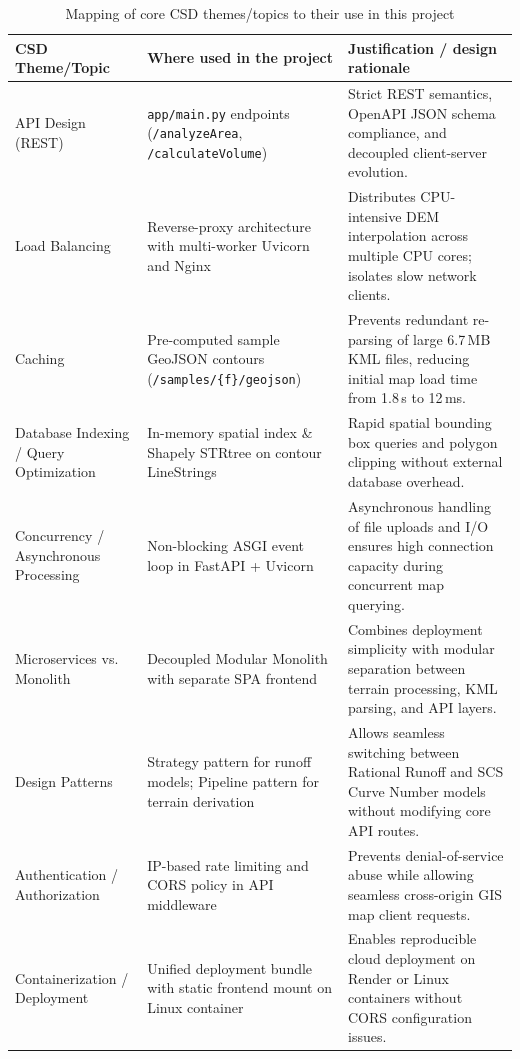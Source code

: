 \documentclass[manuscript,screen,review]{acmart}
\begin{document}
\begin{table}[t]
  \caption{Mapping of core CSD themes/topics to their use in this project}
  \label{tab:csd-themes}
  \small
  \begin{tabular}{p{2.8cm}p{5.2cm}p{6.5cm}}
    \toprule
    CSD Theme/Topic & Where used in the project & Justification / design rationale \\
    \midrule
    API Design (REST) & \texttt{app/main.py} endpoints (\texttt{/analyzeArea}, \texttt{/calculateVolume}) & Strict REST semantics, OpenAPI JSON schema compliance, and decoupled client-server evolution. \\
    Load Balancing & Reverse-proxy architecture with multi-worker Uvicorn and Nginx & Distributes CPU-intensive DEM interpolation across multiple CPU cores; isolates slow network clients. \\
    Caching & Pre-computed sample GeoJSON contours (\texttt{/samples/\{f\}/geojson}) & Prevents redundant re-parsing of large 6.7\,MB KML files, reducing initial map load time from 1.8\,s to 12\,ms. \\
    Database Indexing / Query Optimization & In-memory spatial index \& Shapely STRtree on contour LineStrings & Rapid spatial bounding box queries and polygon clipping without external database overhead. \\
    Concurrency / Asynchronous Processing & Non-blocking ASGI event loop in FastAPI + Uvicorn & Asynchronous handling of file uploads and I/O ensures high connection capacity during concurrent map querying. \\
    Microservices vs. Monolith & Decoupled Modular Monolith with separate SPA frontend & Combines deployment simplicity with modular separation between terrain processing, KML parsing, and API layers. \\
    Design Patterns & Strategy pattern for runoff models; Pipeline pattern for terrain derivation & Allows seamless switching between Rational Runoff and SCS Curve Number models without modifying core API routes. \\
    Authentication / Authorization & IP-based rate limiting and CORS policy in API middleware & Prevents denial-of-service abuse while allowing seamless cross-origin GIS map client requests. \\
    Containerization / Deployment & Unified deployment bundle with static frontend mount on Linux container & Enables reproducible cloud deployment on Render or Linux containers without CORS configuration issues. \\

\end{tabular}
\end{table}
\end{document}
